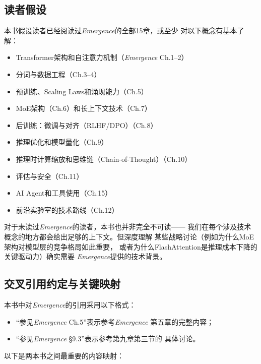 \subsection{读者假设}

本书假设读者已经阅读过\textit{Emergence}的全部15章，或至少
对以下概念有基本了解：

\begin{itemize}
  \item Transformer架构和自注意力机制（\textit{Emergence} Ch.1--2）
  \item 分词与数据工程（Ch.3--4）
  \item 预训练、Scaling Laws和涌现能力（Ch.5）
  \item MoE架构（Ch.6）和长上下文技术（Ch.7）
  \item 后训练：微调与对齐（RLHF/DPO）（Ch.8）
  \item 推理优化和模型量化（Ch.9）
  \item 推理时计算缩放和思维链（Chain-of-Thought）（Ch.10）
  \item 评估与安全（Ch.11）
  \item AI Agent和工具使用（Ch.15）
  \item 前沿实验室的技术路线（Ch.12）
\end{itemize}

对于未读过\textit{Emergence}的读者，本书也并非完全不可读——
我们在每个涉及技术概念的地方都会给出足够的上下文。但深度理解
某些战略讨论（例如为什么MoE架构对模型层的竞争格局如此重要，
或者为什么FlashAttention是推理成本下降的关键驱动力）确实需要
\textit{Emergence}提供的技术背景。

\subsection{交叉引用约定与关键映射}

本书中对\textit{Emergence}的引用采用以下格式：
\begin{itemize}
  \item ``参见\textit{Emergence} Ch.5''表示参考\textit{Emergence}
    第五章的完整内容；
  \item ``参见\textit{Emergence} \S9.3''表示参考第九章第三节的
    具体讨论。
\end{itemize}

以下是两本书之间最重要的内容映射：

